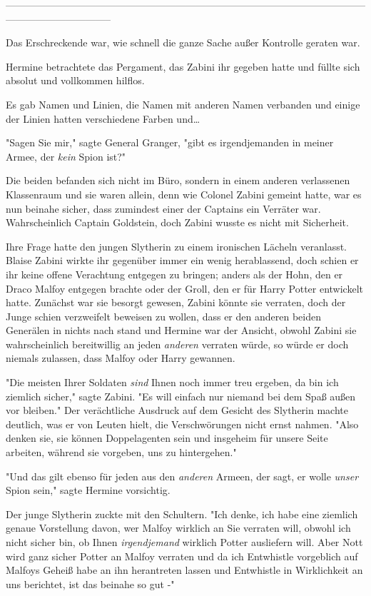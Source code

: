 {--------------------------------------------------------------------------------------------------------------------------------------------

Das Erschreckende war, wie schnell die ganze Sache außer Kontrolle geraten war.

Hermine betrachtete das Pergament, das Zabini ihr gegeben hatte und füllte sich absolut und vollkommen hilflos.

Es gab Namen und Linien, die Namen mit anderen Namen verbanden und einige der Linien hatten verschiedene Farben und…

"Sagen Sie mir," sagte General Granger, "gibt es irgendjemanden in meiner Armee, der \emph{kein} Spion ist?"

Die beiden befanden sich nicht im Büro, sondern in einem anderen verlassenen Klassenraum und sie waren allein, denn wie Colonel Zabini gemeint hatte, war es nun beinahe sicher, dass zumindest einer der Captains ein Verräter war. Wahrscheinlich Captain Goldstein, doch Zabini wusste es nicht mit Sicherheit.

Ihre Frage hatte den jungen Slytherin zu einem ironischen Lächeln veranlasst. Blaise Zabini wirkte ihr gegenüber immer ein wenig herablassend, doch schien er ihr keine offene Verachtung entgegen zu bringen; anders als der Hohn, den er Draco Malfoy entgegen brachte oder der Groll, den er für Harry Potter entwickelt hatte. Zunächst war sie besorgt gewesen, Zabini könnte sie verraten, doch der Junge schien verzweifelt beweisen zu wollen, dass er den anderen beiden Generälen in nichts nach stand und Hermine war der Ansicht, obwohl Zabini sie wahrscheinlich bereitwillig an jeden \emph{anderen} verraten würde, so würde er doch niemals zulassen, dass Malfoy oder Harry gewannen.

"Die meisten Ihrer Soldaten \emph{sind} Ihnen noch immer treu ergeben, da bin ich ziemlich sicher," sagte Zabini. "Es will einfach nur niemand bei dem Spaß außen vor bleiben." Der verächtliche Ausdruck auf dem Gesicht des Slytherin machte deutlich, was er von Leuten hielt, die Verschwörungen nicht ernst nahmen. "Also denken sie, sie können Doppelagenten sein und insgeheim für unsere Seite arbeiten, während sie vorgeben, uns zu hintergehen."

"Und das gilt ebenso für jeden aus den \emph{anderen} Armeen, der sagt, er wolle \emph{unser} Spion sein," sagte Hermine vorsichtig.

Der junge Slytherin zuckte mit den Schultern. "Ich denke, ich habe eine ziemlich genaue Vorstellung davon, wer Malfoy wirklich an Sie verraten will, obwohl ich nicht sicher bin, ob Ihnen \emph{irgendjemand} wirklich Potter ausliefern will. Aber Nott wird ganz sicher Potter an Malfoy verraten und da ich Entwhistle vorgeblich auf Malfoys Geheiß habe an ihn herantreten lassen und Entwhistle in Wirklichkeit an uns berichtet, ist das beinahe so gut -"

}
